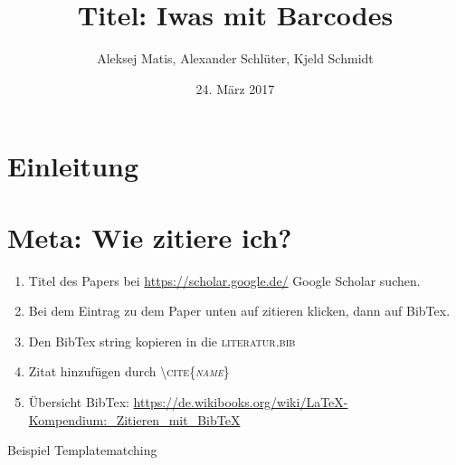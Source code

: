 \documentclass[12pt,a4paper]{article}
\author{Aleksej Matis, Alexander Schlüter, Kjeld Schmidt}
\title{Titel: Iwas mit Barcodes}
\date{24. März 2017}
\begin{document}

\setcounter{page}{0}
\maketitle
\thispagestyle{empty} 
\tableofcontents
\newpage
\section{Einleitung} 


\newpage
\section{Meta: Wie zitiere ich?} 
\begin{enumerate}
\item Titel des Papers bei \url{https://scholar.google.de/} Google Scholar suchen.
\item Bei dem Eintrag zu dem Paper unten auf zitieren klicken, dann auf BibTex.
\item Den BibTex string kopieren in die \textsc{literatur.bib}
\item Zitat hinzufügen durch \textsc{\textbackslash cite\{\textit{name}\}}
\item Übersicht BibTex: \url{https://de.wikibooks.org/wiki/LaTeX-Kompendium:_Zitieren_mit_BibTeX}
\end{enumerate}
Beispiel Templatematching \cite{chen2014scanning}
%

%

\newpage
\appendix


\end{document}
